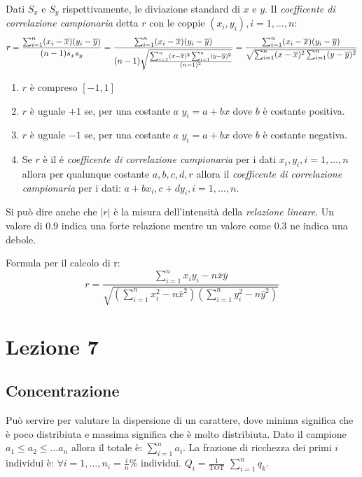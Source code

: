 \documentclass{article}
\begin{document}
\begin{tcolorbox}
  Dati $S_x$ e $S_y$ rispettivamente, le diviazione standard di $x$ e $y$. Il \textit{coefficente di correlazione campionaria} detta $r$ con le coppie $(x_i,y_i),i=1,\dots,n$: $$r=\frac{\sum_{i=1}^n(x_i-\overline{x})(y_i-\overline{y})}{(n-1)s_xs_y}= \\ \frac{
\sum_{i=1}^n(x_i-\overline{x})(y_i-\overline{y})}{(n-1)\sqrt{\frac{\sum_{i=1}^n(x-\overline{x})^2 \sum_{i=1}^n(y-\overline{y})^2}{(n-1)^2}  }}= \frac{
\sum_{i=1}^n(x_i-\overline{x})(y_i-\overline{y})}{\sqrt{\sum_{i=1}^n(x-\overline{x})^2 \sum_{i=1}^n(y-\overline{y})^2}}$$ 


\begin{enumerate}
  \item $r$ è compreso $[-1,1]$ 
  \item $r$ è uguale $+1$ se, per una costante $a$ $y_i=a+bx$ dove $b$ è costante positiva.
  \item $r$ è uguale $-1$ se, per una costante $a$ $y_i=a+bx$ dove $b$ è costante negativa.
  \item Se $r$ è il é \textit{coefficente di correlazione campionaria} per i dati $x_i,y_i, i=1,\dots,n$ allora per qualunque costante $a,b,c,d,r$ allora il \textit{coefficente di correlazione campionaria} per i dati: $a+bx_i,c+dy_i, i=1,\dots,n$. 

\end{enumerate}

Si può dire anche che $|r|$ è la misura dell'intensità della \textit{relazione lineare}. Un valore di $0.9$ indica una forte relazione mentre un valore come $0.3$ ne indica una debole. 



\end{tcolorbox}

Formula per il calcolo di r: 
  $$r = \frac{\sum_{i=1}^{n} x_i y_i - n \bar{x} \bar{y}}{\sqrt{\left(\sum_{i=1}^{n} x_i^2 - n \bar{x}^2\right) \left(\sum_{i=1}^{n} y_i^2 - n \bar{y}^2\right)}}$$



\section*{Lezione 7}


\subsection*{Concentrazione}

Può servire per valutare la dispersione di un carattere, dove minima significa che è poco distribiuta e massima significa che è molto distribiuta. Dato il campione $a_1 \le a_2 \le \dots a_n$ allora il totale è: $\sum_{i=1}^na_i$. La frazione di ricchezza dei primi $i$ individui è: $\forall i=1,\dots,n _i=\frac{i}{n}$\% individui. $Q_i=\frac{1}{\text{TOT}}$ $\sum_{i=1}^nq_k$.
\end{document}
